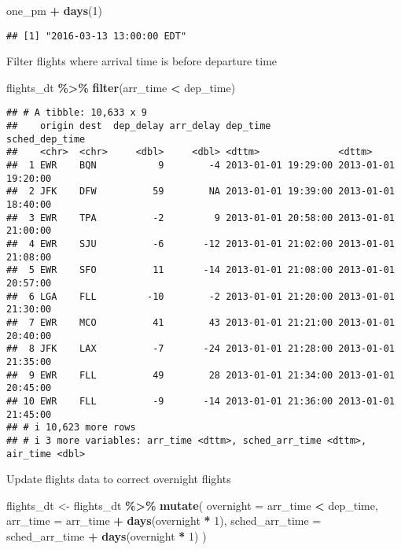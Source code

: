 \documentclass[
]{article}
\newenvironment{Shaded}{\begin{snugshade}}{\end{snugshade}}
\newcommand{\AttributeTok}[1]{\textcolor[rgb]{0.13,0.29,0.53}{#1}}
\newcommand{\DecValTok}[1]{\textcolor[rgb]{0.00,0.00,0.81}{#1}}
\newcommand{\FunctionTok}[1]{\textcolor[rgb]{0.13,0.29,0.53}{\textbf{#1}}}
\newcommand{\NormalTok}[1]{#1}
\newcommand{\OtherTok}[1]{\textcolor[rgb]{0.56,0.35,0.01}{#1}}
\newcommand{\SpecialCharTok}[1]{\textcolor[rgb]{0.81,0.36,0.00}{\textbf{#1}}}
\begin{document}
\begin{Shaded}
\begin{Highlighting}[]
\NormalTok{one\_pm }\SpecialCharTok{+} \FunctionTok{days}\NormalTok{(}\DecValTok{1}\NormalTok{)}
\end{Highlighting}
\end{Shaded}

\begin{verbatim}
## [1] "2016-03-13 13:00:00 EDT"
\end{verbatim}

Filter flights where arrival time is before departure time

\begin{Shaded}
\begin{Highlighting}[]
\NormalTok{flights\_dt }\SpecialCharTok{\%\textgreater{}\%} 
  \FunctionTok{filter}\NormalTok{(arr\_time }\SpecialCharTok{\textless{}}\NormalTok{ dep\_time) }
\end{Highlighting}
\end{Shaded}

\begin{verbatim}
## # A tibble: 10,633 x 9
##    origin dest  dep_delay arr_delay dep_time            sched_dep_time     
##    <chr>  <chr>     <dbl>     <dbl> <dttm>              <dttm>             
##  1 EWR    BQN           9        -4 2013-01-01 19:29:00 2013-01-01 19:20:00
##  2 JFK    DFW          59        NA 2013-01-01 19:39:00 2013-01-01 18:40:00
##  3 EWR    TPA          -2         9 2013-01-01 20:58:00 2013-01-01 21:00:00
##  4 EWR    SJU          -6       -12 2013-01-01 21:02:00 2013-01-01 21:08:00
##  5 EWR    SFO          11       -14 2013-01-01 21:08:00 2013-01-01 20:57:00
##  6 LGA    FLL         -10        -2 2013-01-01 21:20:00 2013-01-01 21:30:00
##  7 EWR    MCO          41        43 2013-01-01 21:21:00 2013-01-01 20:40:00
##  8 JFK    LAX          -7       -24 2013-01-01 21:28:00 2013-01-01 21:35:00
##  9 EWR    FLL          49        28 2013-01-01 21:34:00 2013-01-01 20:45:00
## 10 EWR    FLL          -9       -14 2013-01-01 21:36:00 2013-01-01 21:45:00
## # i 10,623 more rows
## # i 3 more variables: arr_time <dttm>, sched_arr_time <dttm>, air_time <dbl>
\end{verbatim}

Update flights data to correct overnight flights

\begin{Shaded}
\begin{Highlighting}[]
\NormalTok{flights\_dt }\OtherTok{\textless{}{-}}\NormalTok{ flights\_dt }\SpecialCharTok{\%\textgreater{}\%} 
  \FunctionTok{mutate}\NormalTok{(}
    \AttributeTok{overnight =}\NormalTok{ arr\_time }\SpecialCharTok{\textless{}}\NormalTok{ dep\_time,}
    \AttributeTok{arr\_time =}\NormalTok{ arr\_time }\SpecialCharTok{+} \FunctionTok{days}\NormalTok{(overnight }\SpecialCharTok{*} \DecValTok{1}\NormalTok{),}
    \AttributeTok{sched\_arr\_time =}\NormalTok{ sched\_arr\_time }\SpecialCharTok{+} \FunctionTok{days}\NormalTok{(overnight }\SpecialCharTok{*} \DecValTok{1}\NormalTok{)}
\NormalTok{  )}
\end{Highlighting}
\end{Shaded}
\end{document}
